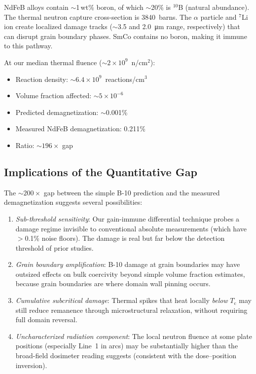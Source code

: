 \documentclass[11pt,letterpaper]{article}
\newcommand{\Tc}{T_\mathrm{c}}
\begin{document}
NdFeB alloys contain $\sim$1\,wt\% boron, of which $\sim$20\% is
${}^{10}$B (natural abundance). The thermal neutron capture cross-section is
\SI{3840}{barns}. The $\alpha$ particle and ${}^{7}$Li ion create localized
damage tracks ($\sim$3.5 and \SI{2.0}{\micro m} range, respectively) that can
disrupt grain boundary phases. SmCo contains no boron, making it
immune to this pathway.

At our median thermal fluence ($\sim$$2 \times 10^9$~n/cm$^2$):
\begin{itemize}
    \item Reaction density: $\sim$$6.4 \times 10^9$~reactions/cm$^3$
    \item Volume fraction affected: $\sim$$5 \times 10^{-6}$
    \item Predicted demagnetization: $\sim$0.001\%
    \item Measured NdFeB demagnetization: 0.211\%
    \item Ratio: $\sim$$196\times$ gap
\end{itemize}

\subsection{Implications of the Quantitative Gap}

The $\sim$$200\times$ gap between the simple B-10 prediction and the measured
demagnetization suggests several possibilities:

\begin{enumerate}
    \item \emph{Sub-threshold sensitivity}: Our gain-immune differential
    technique probes a damage regime invisible to conventional absolute
    measurements (which have $>$0.1\% noise floors). The damage is real but far
    below the detection threshold of prior studies.

    \item \emph{Grain boundary amplification}: B-10 damage at grain
    boundaries may have outsized effects on bulk coercivity beyond simple
    volume fraction estimates, because grain boundaries are where domain wall
    pinning occurs.

    \item \emph{Cumulative subcritical damage}: Thermal spikes that heat
    locally \emph{below} $\Tc$ may still reduce remanence through
    microstructural relaxation, without requiring full domain reversal.

    \item \emph{Uncharacterized radiation component}: The local neutron
    fluence at some plate positions (especially Line~1 in arcs) may be
    substantially higher than the broad-field dosimeter reading suggests
    (consistent with the dose--position inversion).
\end{enumerate}
\end{document}
